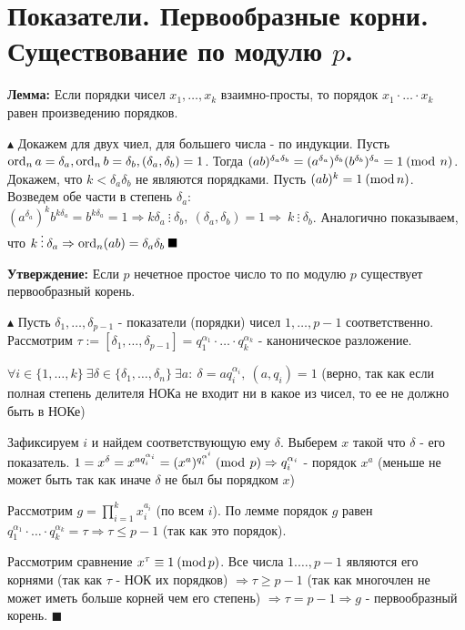 \setcounter{section}{90}
\section{Показатели. Первообразные корни. Существование по модулю $p$.}
\par \textbf{Лемма:} Если порядки чисел $x_1, \ldots, x_k$ взаимно-просты, то порядок $x_1\cdot\ldots\cdot x_k$ равен произведению порядков.
\par $\blacktriangle$ Докажем для двух чиел, для большего числа - по индукции. Пусть $\operatorname{ord}_n a=\delta_a, \operatorname{ord}_n b=\delta_b, (\delta_a, \delta_b)=1$. Тогда $(ab)^{\delta_a\delta_b}=(a^{\delta_a})^{\delta_b}(b^{\delta_b})^{\delta_a}=1 \: (\operatorname{mod} \: n)$. Докажем, что $k<\delta_a \delta_b$ не являются порядками. Пусть $(ab)^k =1 \: (\operatorname{mod} n)$. Возведем обе части в степень $\delta_a$: $(a^{\delta_a})^kb^{k\delta_a}=b^{k\delta_a}=1\Rightarrow k \delta_a \: \vdots \: \delta_b, \: (\delta_a, \delta_b)=1 \Rightarrow \: k \: \vdots \: \delta_b$. Аналогично показываем, что $k \: \vdots \: \delta_a \Rightarrow \operatorname{ord}_n(ab)=\delta_a \delta_b \: \blacksquare$
\par \textbf{Утверждение:} Если $p$ нечетное простое число то по модулю $p$ существует первообразный корень.
\par $\blacktriangle$ Пусть $\delta_1, \ldots, \delta_{p-1}$ - показатели (порядки) чисел $1, \ldots, p-1$ соответственно. Рассмотрим $\tau:=[\delta_1, \ldots, \delta_{p-1}]=q_1^{\alpha_1}\cdot \ldots \cdot q_k^{\alpha_k}$ - каноническое разложение.
\par $\forall i \in \{1, \ldots, k\} \: \exists \delta \in \{\delta_1, \ldots, \delta_n\} \: \exists a: \: \delta=aq_i^{\alpha_i}, \: (a, q_i)=1$ (верно, так как если полная степень делителя НОКа не входит ни в какое из чисел, то ее не должно быть в НОКе)
\par Зафиксируем $i$ и найдем соответствующую ему $\delta$. Выберем $x$ такой что $\delta$ - его показатель. $1=x^\delta=x^{aq_i^{\alpha_i}}=(x^a)^{q_i^{\alpha^i}} \: (\operatorname{mod} \: p) \Rightarrow q_i^{\alpha_i}$ - порядок $x^a$ (меньше не может быть так как иначе $\delta$ не был бы порядком $x$)
\par Рассмотрим $g=\prod_{i=1}^k x_i^{a_i}$ (по всем $i$). По лемме порядок $g$ равен $q_1^{\alpha_1}\cdot \ldots \cdot q_k^{\alpha_k}=\tau \Rightarrow \tau \leq p-1$ (так как это порядок).
\par Рассмотрим сравнение $x^\tau \equiv 1 \: (\operatorname{mod} p)$. Все числа $1. \ldots, p-1$ являются его корнями (так как $\tau$ - НОК их порядков) $\Rightarrow \tau \geq p-1$ (так как многочлен не может иметь больше корней чем его степень) $\Rightarrow \tau=p-1 \Rightarrow g$ - первообразный корень. $\blacksquare$


